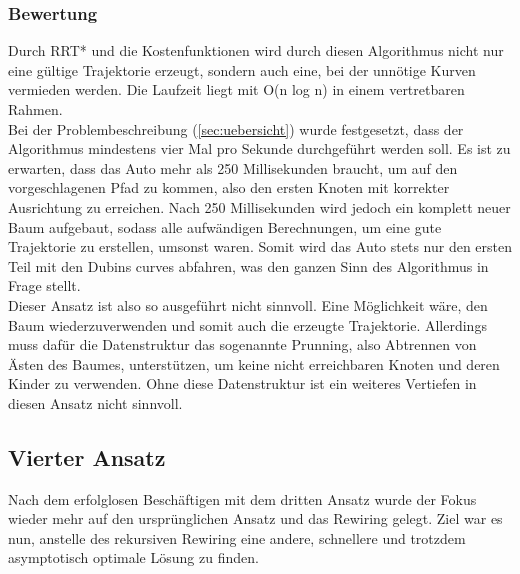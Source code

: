 \subsubsection{Bewertung}
Durch RRT* und die Kostenfunktionen wird durch diesen Algorithmus nicht nur eine gültige Trajektorie erzeugt, sondern auch eine, bei der unnötige Kurven vermieden werden. Die Laufzeit liegt mit O(n log n) in einem vertretbaren Rahmen. \\
Bei der Problembeschreibung (\ref{sec:uebersicht}) wurde festgesetzt, dass der Algorithmus mindestens vier Mal pro Sekunde durchgeführt werden soll. Es ist zu erwarten, dass das Auto mehr als 250 Millisekunden braucht, um auf den vorgeschlagenen Pfad zu kommen, also den ersten Knoten mit korrekter Ausrichtung zu erreichen. Nach 250 Millisekunden wird jedoch ein komplett neuer Baum aufgebaut, sodass alle aufwändigen Berechnungen, um eine gute Trajektorie zu erstellen, umsonst waren. Somit wird das Auto stets nur den ersten Teil mit den Dubins curves abfahren, was den ganzen Sinn des Algorithmus in Frage stellt. \\
Dieser Ansatz ist also so ausgeführt nicht sinnvoll. Eine Möglichkeit wäre, den Baum wiederzuverwenden und somit auch die erzeugte Trajektorie. Allerdings muss dafür die Datenstruktur das sogenannte Prunning, also Abtrennen von Ästen des Baumes, unterstützen, um keine nicht erreichbaren Knoten und deren Kinder zu verwenden. Ohne diese Datenstruktur ist ein weiteres Vertiefen in diesen Ansatz nicht sinnvoll.

\subsection{Vierter Ansatz}
Nach dem erfolglosen Beschäftigen mit dem dritten Ansatz wurde der Fokus wieder mehr auf den ursprünglichen Ansatz und das Rewiring gelegt. Ziel war es nun, anstelle des rekursiven Rewiring eine andere, schnellere und trotzdem asymptotisch optimale Lösung zu finden. \\
